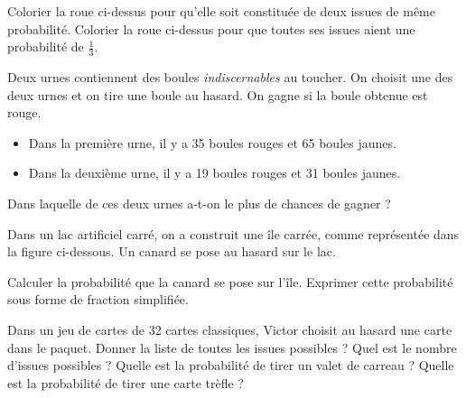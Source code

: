 \documentclass[../Cours.tex]{subfiles}
\begin{document}
\begin{questions}
    \exercice
    \begin{center}
    \end{center}

    \question Colorier la roue ci-dessus pour qu'elle soit constituée de deux issues de même probabilité.
    \question Colorier la roue ci-dessus pour que toutes ses issues aient une probabilité de $\frac{1}{3}$.

    \clearpage
    \exercice Deux urnes contiennent des boules \emph{indiscernables} au toucher. On choisit une des deux urnes et on tire une boule au hasard. On gagne si la boule obtenue est rouge.
    \begin{itemize}
        \item Dans la première urne, il y a 35 boules rouges et 65 boules jaunes.
        \item Dans la deuxième urne, il y a 19 boules rouges et 31 boules jaunes.
    \end{itemize}
    \question Dans laquelle de ces deux urnes a-t-on le plus de chances de gagner ?

    \exercice Dans un lac artificiel carré, on a construit une île carrée, comme représentée dans la figure ci-dessous. Un canard se pose au hasard sur le lac.

    \begin{center}
    \end{center}

    \question Calculer la probabilité que la canard se pose sur l'île.
    \question Exprimer cette probabilité sous forme de fraction simplifiée.

    \exercice Dans un jeu de cartes de 32 cartes classiques, Victor choisit au hasard une carte dans le paquet.
    \question Donner la liste de toutes les issues possibles ?
    \question Quel est le nombre d'issues possibles ?
    \question Quelle est la probabilité de tirer un valet de carreau ?
    \question Quelle est la probabilité de tirer une carte trèfle ?
    

\end{questions}
\end{document}

